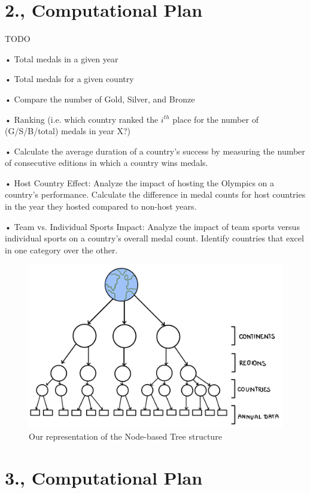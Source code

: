 \documentclass[fontsize=11pt]{article}
\begin{document}
\section*{2., Computational Plan}

TODO

 • Total medals in a given year

 • Total medals for a given country

 • Compare the number of Gold, Silver, and Bronze

 • Ranking (i.e. which country ranked the $i^{th}$ place for the number of (G/S/B/total) medals in year X?)

• Calculate the average duration of a country's success by measuring the number of consecutive editions in which a country wins medals. 

• Host Country Effect:
Analyze the impact of hosting the Olympics on a country's performance. Calculate the difference in medal counts for host countries in the year they hosted compared to non-host years.

• Team vs. Individual Sports Impact:
Analyze the impact of team sports versus individual sports on a country's overall medal count. Identify countries that excel in one category over the other.


\begin{figure}
    \centering
    \includegraphics[width=0.5\linewidth]{tree_representation.jpg}
    \caption{Our representation of the Node-based Tree structure}
    \label{fig:enter-label}
\end{figure}

\section*{3., Computational Plan}
\end{document}
